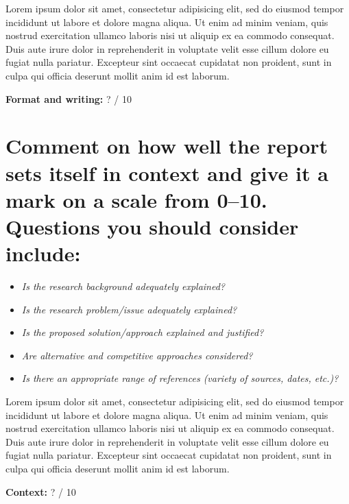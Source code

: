 \documentclass[10pt,a4paper]{article}
\begin{document}
\begin{framed}
Lorem ipsum dolor sit amet, consectetur adipisicing elit, sed do eiusmod
tempor incididunt ut labore et dolore magna aliqua. Ut enim ad minim veniam,
quis nostrud exercitation ullamco laboris nisi ut aliquip ex ea commodo
consequat. Duis aute irure dolor in reprehenderit in voluptate velit esse
cillum dolore eu fugiat nulla pariatur. Excepteur sint occaecat cupidatat non
proident, sunt in culpa qui officia deserunt mollit anim id est laborum.

\flushright \textbf{Format and writing:} ? / 10
\end{framed}


\section{Comment on how well the report sets itself in context and give it a mark on a scale from 0–10.  Questions you should consider include:}

\begin{itemize}\addtolength{\itemsep}{-0.5\baselineskip}
	\item \emph{Is the research background adequately explained?}
	\item \emph{Is the research problem/issue adequately explained?}
	\item \emph{Is the proposed solution/approach explained and justified?}
	\item \emph{Are alternative and competitive approaches considered?}
	\item \emph{Is there an appropriate range of references (variety of sources, dates, etc.)?}
\end{itemize}

\begin{framed}
Lorem ipsum dolor sit amet, consectetur adipisicing elit, sed do eiusmod
tempor incididunt ut labore et dolore magna aliqua. Ut enim ad minim veniam,
quis nostrud exercitation ullamco laboris nisi ut aliquip ex ea commodo
consequat. Duis aute irure dolor in reprehenderit in voluptate velit esse
cillum dolore eu fugiat nulla pariatur. Excepteur sint occaecat cupidatat non
proident, sunt in culpa qui officia deserunt mollit anim id est laborum.

\flushright \textbf{Context:} ? / 10
\end{framed}

\end{document}
